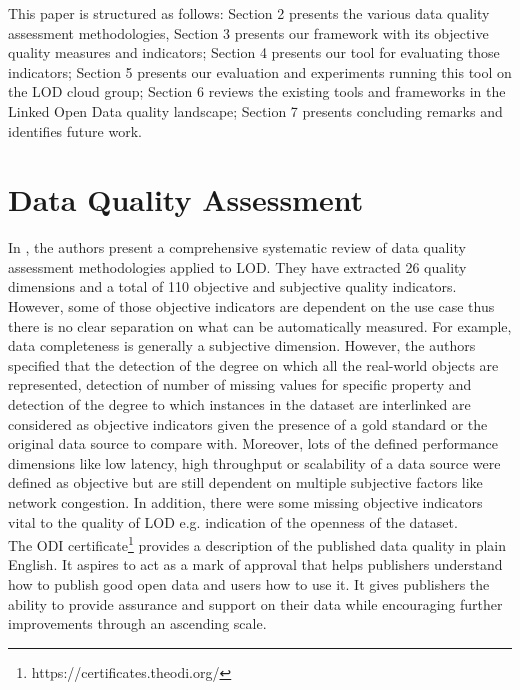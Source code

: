 \documentclass[onecolumn, crcready]{iosart2c}
\begin{document}
This paper is structured as follows: Section 2 presents the various data quality assessment methodologies, Section 3 presents our framework with its objective quality measures and indicators; Section 4 presents our tool for evaluating those indicators; Section 5 presents our evaluation and experiments running this tool on the LOD cloud group; Section 6 reviews the existing tools and frameworks in the Linked Open Data quality landscape; Section 7 presents concluding remarks and identifies future work.

\section{Data Quality Assessment}

In \cite{Framework2012}, the authors present a comprehensive systematic review of data quality assessment methodologies applied to LOD. They have extracted 26 quality dimensions and a total of 110 objective and subjective quality indicators. However, some of those objective indicators are dependent on the use case thus there is no clear separation on what can be automatically measured. For example, data completeness is generally a subjective dimension. However, the authors specified that the detection of the degree on which all the real-world objects are represented, detection of number of missing values for specific property and detection of the degree to which instances in the dataset are interlinked are considered as objective indicators given the presence of a gold standard or the original data source to compare with. Moreover, lots of the defined performance dimensions like low latency, high throughput or scalability of a data source were defined as objective but are still dependent on multiple subjective factors like network congestion. In addition, there were some missing objective indicators vital to the quality of LOD e.g. indication of the openness of the dataset.\\

The ODI certificate\footnote {https://certificates.theodi.org/} provides a description of the published data quality in plain English. It aspires to act as a mark of approval that helps publishers understand how to publish good open data and users how to use it. It gives publishers the ability to provide assurance and support on their data while encouraging further improvements through an ascending scale.
\end{document}
